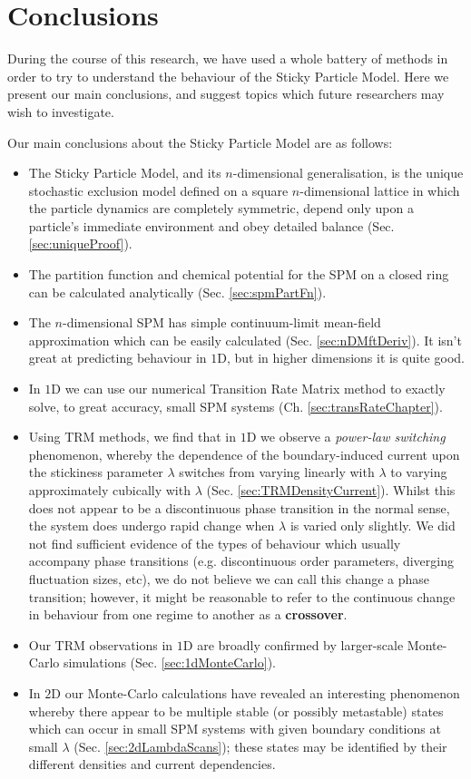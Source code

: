 \chapter{Conclusions} \label{sec:conclusionsChap}
During the course of this research, we have used a whole battery of methods in order to try to understand
the behaviour of the Sticky Particle Model. Here we present our main conclusions, and suggest topics which
future researchers may wish to investigate.

Our main conclusions about the Sticky Particle Model are as follows:
\begin{itemize}
 \item The Sticky Particle Model, and its $n$-dimensional generalisation, is the unique stochastic exclusion 
 model defined on a square $n$-dimensional lattice in which the particle dynamics are completely symmetric,
 depend only upon a particle's immediate environment and obey detailed balance (Sec. \ref{sec:uniqueProof}).
 \item The partition function and chemical potential for the SPM on a closed ring can be calculated analytically (Sec. \ref{sec:spmPartFn}).
 \item The $n$-dimensional SPM has simple continuum-limit mean-field approximation which can be easily
 calculated (Sec. \ref{sec:nDMftDeriv}). It isn't great at predicting behaviour in $1$D, but in higher dimensions
 it is quite good.
 \item In $1$D we can use our numerical Transition Rate Matrix method to exactly solve, to great accuracy,
 small SPM systems (Ch. \ref{sec:transRateChapter}).
 \item Using TRM methods, we find that in $1$D we observe a \textit{power-law switching} phenomenon, whereby the dependence of the boundary-induced current upon the stickiness parameter $\lambda$ switches from
 varying linearly with $\lambda$ to varying approximately cubically with $\lambda$ 
 (Sec. \ref{sec:TRMDensityCurrent}). Whilst this does not appear to be a discontinuous phase transition in the
 normal sense, the system does undergo rapid change when $\lambda$ is varied only slightly. We did not find
 sufficient evidence of the types of behaviour which usually accompany phase transitions (e.g. discontinuous order
 parameters, diverging fluctuation sizes, etc), we do not believe we can call this change a phase transition;
 however, it might be reasonable to refer to the continuous change in  behaviour from one regime to another as a
 \textbf{crossover}.
 \item Our TRM observations in $1$D are broadly confirmed by larger-scale Monte-Carlo simulations 
 (Sec. \ref{sec:1dMonteCarlo}).
 \item In $2$D our Monte-Carlo calculations have revealed an interesting phenomenon whereby there appear
 to be multiple stable (or possibly metastable) states which can occur in small SPM systems with given boundary
 conditions at small $\lambda$ (Sec. \ref{sec:2dLambdaScans}); these states may be identified by their 
 different densities and current dependencies.
\end{itemize}

